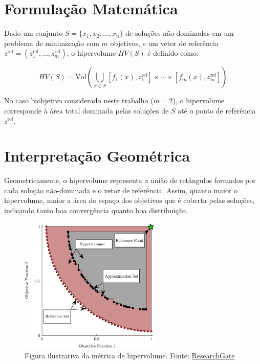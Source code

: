 \documentclass[
	12pt,				%
	oneside,			%
	a4paper,			%
	chapter=TITLE,
	sumario=tradicional,
	english,			%
	brazil				%
]{abntex2}
\begin{document}
\section{Formulação Matemática}

Dado um conjunto $S = \{x_1, x_2, \dots, x_n\}$ de soluções não-dominadas em um problema de minimização com $m$ objetivos, e um vetor de
referência $z^{\text{ref}} = (z_1^{\text{ref}}, \dots, z_m^{\text{ref}})$, o hipervolume $HV(S)$ é definido como:

\begin{equation}
HV(S) = \text{Vol} \left( \bigcup_{x \in S} [f_1(x), z_1^{\text{ref}}] \times \cdots \times [f_m(x), z_m^{\text{ref}}] \right)
\end{equation}

No caso biobjetivo considerado neste trabalho ($m = 2$), o hipervolume corresponde à área total dominada pelas soluções de $S$ até o
ponto de referência $z^{\text{ref}}$.

\section{Interpretação Geométrica}

Geometricamente, o hipervolume representa a união de retângulos formados por cada solução não-dominada e o vetor de referência.
Assim, quanto maior o hipervolume, maior a área do espaço dos objetivos que é coberta pelas soluções, indicando tanto boa convergência quanto boa distribuição.

\begin{figure}[h!]
	\caption{\label{fig:hypervolume}Figura ilustrativa da métrica de hipervolume. Fonte: \href{https://www.researchgate.net/figure/Illustration-of-the-hypervolume-metric-for-an-optimization-problem-with-two-objective_fig3_331214313}{ResearchGate}}
	\begin{center}
    \includegraphics[width=0.6\textwidth,clip]{Illustration-hypervolume-metric.png}
	\end{center}
\end{figure}
\end{document}
